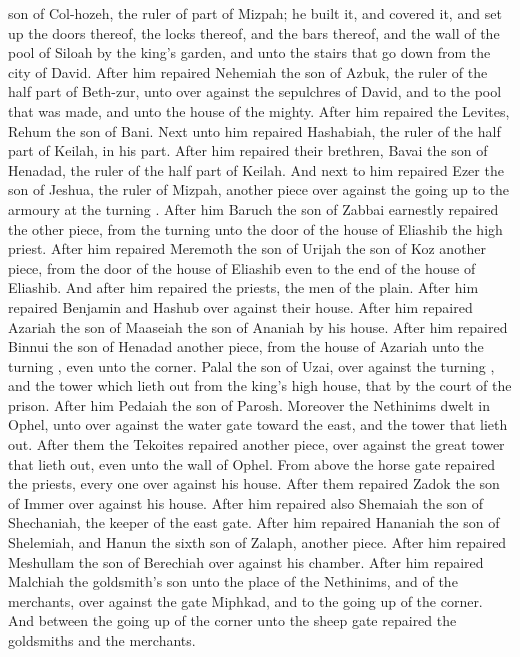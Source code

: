 {son of
Col-hozeh, the
ruler of
part of
Mizpah; he
built it, and
covered it, and set
up the
doors thereof, the
locks thereof, and the
bars thereof, and the
wall of the
pool of
Siloah by the
king’s
garden, and unto the
stairs that go
down from the
city of
David.
After him
repaired
Nehemiah the
son of
Azbuk, the
ruler of the
half
part of
Beth-zur, unto
{} over against the
sepulchres of
David, and to the
pool that was
made, and unto the
house of the
mighty.
After him
repaired the
Levites,
Rehum the
son of
Bani. Next unto
him
repaired
Hashabiah, the
ruler of the
half
part of
Keilah, in his
part.
After him
repaired their
brethren,
Bavai the
son of
Henadad, the
ruler of the
half
part of
Keilah.
And next to
him
repaired
Ezer the
son of
Jeshua, the
ruler of
Mizpah,
another
piece over against the going
up to the
armoury at the
turning
{}.
After him
Baruch the
son of
Zabbai
earnestly
repaired the
other
piece, from the
turning
{} unto the
door of the
house of
Eliashib the
high
priest.
After him
repaired
Meremoth the
son of
Urijah the
son of
Koz
another
piece, from the
door of the
house of
Eliashib even to the
end of the
house of
Eliashib.
And
after him
repaired the
priests, the
men of the
plain.
After him
repaired
Benjamin and
Hashub over against their
house.
After him
repaired
Azariah the
son of
Maaseiah the
son of
Ananiah
by his
house.
After him
repaired
Binnui the
son of
Henadad
another
piece, from the
house of
Azariah unto the
turning
{}, even unto the
corner.
Palal the
son of
Uzai, over against the
turning
{}, and the
tower which lieth
out from the
king’s
high
house, that
{} by the
court of the
prison.
After him
Pedaiah the
son of
Parosh.
Moreover the
Nethinims
dwelt in
Ophel, unto
{} over against the
water
gate toward the
east, and the
tower that lieth
out.
After them the
Tekoites
repaired
another
piece, over against the
great
tower that lieth
out, even unto the
wall of
Ophel.
From above the
horse
gate
repaired the
priests, every
one over
against his
house.
After them
repaired
Zadok the
son of
Immer over against his
house.
After him
repaired also
Shemaiah the
son of
Shechaniah, the
keeper of the
east
gate.
After him
repaired
Hananiah the
son of
Shelemiah, and
Hanun the
sixth
son of
Zalaph,
another
piece.
After him
repaired
Meshullam the
son of
Berechiah over against his
chamber.
After him
repaired
Malchiah the
goldsmith’s
son unto the
place of the
Nethinims, and of the
merchants, over against the
gate
Miphkad, and to the going
up of the
corner.
And between the going
up of the
corner unto the
sheep
gate
repaired the
goldsmiths and the
merchants.

}
